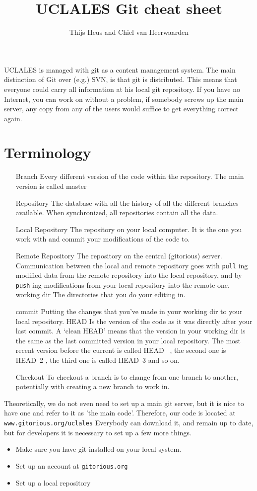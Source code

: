\documentclass[a4paper,10pt] {article}
\title{UCLALES Git cheat sheet}
\author{Thijs Heus and Chiel van Heerwaarden}
\begin{document}
\maketitle
UCLALES is managed with git as a content management system. The main distinction of Git over (e.g.) SVN, is that git is distributed. This means that everyone could carry all information at his local git repository. If you have no Internet, you can work on without a problem, if somebody screws up the main server, any copy from any of the users would suffice to get everything correct again.
  \section{Terminology}
\begin{itemize}
   \item[Branch] Every different version of the code within the repository. The main version is called    master 
   \item[Repository]  The database with all the history of all the different branches available. When synchronized, all repositories contain all the data.
   \item[Local Repository]  The repository on your local computer. It is the one you work with and    commit  your modifications of the code to.
   \item[Remote Repository]  The repository on the central (gitorious) server. Communication between the local and remote repository goes with    \verb|pull| ing modified data from the remote repository into the local repository, and by    \verb|push| ing modifications from your local repository into the remote one.
    working dir  The directories that you do your editing in.
   \item[commit]  Putting the changes that you've made in your working dir to your local repository.
    HEAD  Is the version of the code as it was directly after your last commit. A `clean HEAD' means that the version in your working dir is the same as the last committed version in your local repository. The most recent version before the current is called   HEAD~ , the second one is   HEAD~2 , the third one is called   HEAD~3  and so on.
 \item[Checkout]  To checkout a branch is to change from one branch to another, potentially with creating a new branch to work in.
 
\end{itemize}


Theoretically, we do not even need to set up a main git server, but it is nice to have one and refer to it as 'the main code'. Therefore, our code is located at \verb|www.gitorious.org/uclales|
Everybody can download it, and remain up to date, but for developers it is necessary to set up a few more things.
\begin{itemize}
 \item     Make sure you have git installed on your local system.
 \item  Set up an account at \verb|gitorious.org|
 \item  Set up a local repository

\end{itemize}
\end{document}

